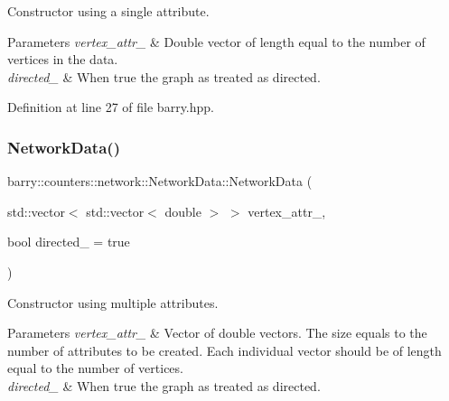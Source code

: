 Constructor using a single attribute. 


\begin{DoxyParams}{Parameters}
{\em vertex\+\_\+attr\+\_\+} & Double vector of length equal to the number of vertices in the data. \\
\hline
{\em directed\+\_\+} & When {\ttfamily true} the graph as treated as directed. \\
\hline
\end{DoxyParams}


Definition at line 27 of file barry.\+hpp.

\mbox{\label{classbarry_1_1counters_1_1network_1_1_network_data_ac37270f77de515f8a60a18b75a5bb60d}} 
\subsubsection{\texorpdfstring{Network\+Data()}{NetworkData()}\hspace{0.1cm}{\footnotesize\ttfamily [3/3]}}
{\footnotesize\ttfamily barry\+::counters\+::network\+::\+Network\+Data\+::\+Network\+Data (\begin{DoxyParamCaption}\item[{std\+::vector$<$ std\+::vector$<$ double $>$ $>$}]{vertex\+\_\+attr\+\_\+,  }\item[{bool}]{directed\+\_\+ = {\ttfamily true} }\end{DoxyParamCaption})\hspace{0.3cm}{\ttfamily [inline]}}



Constructor using multiple attributes. 


\begin{DoxyParams}{Parameters}
{\em vertex\+\_\+attr\+\_\+} & Vector of double vectors. The size equals to the number of attributes to be created. Each individual vector should be of length equal to the number of vertices. \\
\hline
{\em directed\+\_\+} & When {\ttfamily true} the graph as treated as directed. \\
\hline
\end{DoxyParams}


